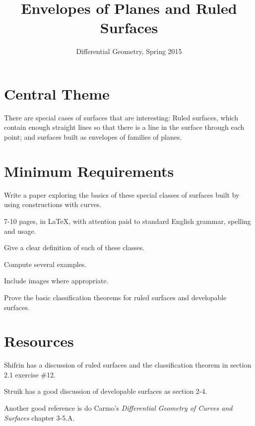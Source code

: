 \documentclass[12pt]{amsart}
\begin{document}
\title{Envelopes of Planes and Ruled Surfaces}
\author{Differential Geometry, Spring 2015}

\maketitle

\section*{Central Theme}

There are special cases of surfaces that are interesting: Ruled surfaces, which contain enough straight lines so that there is a line in the surface through each point; and surfaces built as envelopes of families of planes.

\section*{Minimum Requirements}

Write a paper exploring the basics of these special classes of surfaces built by using constructions with curves. 
\begin{compactitem}
\item 7-10 pages, in \LaTeX, with attention paid to standard English grammar, spelling and usage.
\item Give a clear definition of each of these classes.
\item Compute several examples.
\item Include images where appropriate.
\item Prove the basic classification theorems for ruled surfaces and developable surfaces.
\end{compactitem}


\section*{Resources}

Shifrin has a discussion of ruled surfaces and the classification theorem in section 2.1 exercise \#12.

Struik has a good discussion of developable surfaces as section 2-4.

Another good reference is do Carmo's \emph{Differential Geometry of Curves and Surfaces} chapter 3-5.A.
\end{document}
